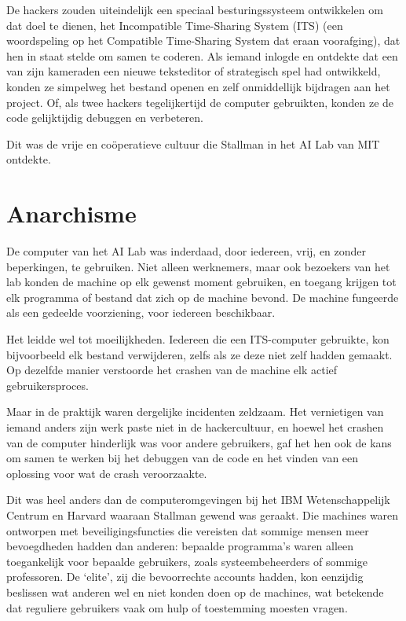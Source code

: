 \documentclass[smalldemyvopaper,11pt,twoside,onecolumn,openright,extrafontsizes,hidelinks]{memoir}
\begin{document}
De hackers zouden uiteindelijk een speciaal besturingssysteem
ontwikkelen om dat doel te dienen, het Incompatible Time-Sharing System
(ITS) (een woordspeling op het Compatible Time-Sharing System dat eraan
voorafging), dat hen in staat stelde om samen te coderen. Als iemand
inlogde en ontdekte dat een van zijn kameraden een nieuwe teksteditor of
strategisch spel had ontwikkeld, konden ze simpelweg het bestand openen
en zelf onmiddellijk bijdragen aan het project. Of, als twee hackers
tegelijkertijd de computer gebruikten, konden ze de code gelijktijdig
debuggen en verbeteren.

Dit was de vrije en coöperatieve cultuur die Stallman in het AI Lab van
MIT ontdekte.

\section{Anarchisme}\label{anarchisme}

De computer van het AI Lab was inderdaad, door iedereen, vrij, en zonder
beperkingen, te gebruiken. Niet alleen werknemers, maar ook bezoekers
van het lab konden de machine op elk gewenst moment gebruiken, en
toegang krijgen tot elk programma of bestand dat zich op de machine
bevond. De machine fungeerde als een gedeelde voorziening, voor iedereen
beschikbaar.

Het leidde wel tot moeilijkheden. Iedereen die een ITS-computer
gebruikte, kon bijvoorbeeld elk bestand verwijderen, zelfs als ze deze
niet zelf hadden gemaakt. Op dezelfde manier verstoorde het crashen van
de machine elk actief gebruikersproces.

Maar in de praktijk waren dergelijke incidenten zeldzaam. Het
vernietigen van iemand anders zijn werk paste niet in de hackercultuur,
en hoewel het crashen van de computer hinderlijk was voor andere
gebruikers, gaf het hen ook de kans om samen te werken bij het debuggen
van de code en het vinden van een oplossing voor wat de crash
veroorzaakte.

Dit was heel anders dan de computeromgevingen bij het IBM
Wetenschappelijk Centrum en Harvard waaraan Stallman gewend was geraakt.
Die machines waren ontworpen met beveiligingsfuncties die vereisten dat
sommige mensen meer bevoegdheden hadden dan anderen: bepaalde
programma's waren alleen toegankelijk voor bepaalde gebruikers, zoals
systeembeheerders of sommige professoren. De `elite', zij die
bevoorrechte accounts hadden, kon eenzijdig beslissen wat anderen wel en
niet konden doen op de machines, wat betekende dat reguliere gebruikers
vaak om hulp of toestemming moesten vragen.
\end{document}
